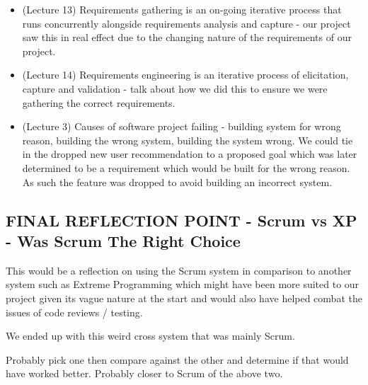 \documentclass{l3proj}
\begin{document}
\begin{itemize}
\item (Lecture 13) Requirements gathering is an on-going iterative process that runs concurrently alongside requirements analysis and capture - our project saw this in real effect due to the changing nature of the requirements of our project.
\item (Lecture 14) Requirements engineering is an iterative process of elicitation, capture and validation - talk about how we did this to ensure we were gathering the correct requirements.
\item (Lecture 3) Causes of software project failing - building system for wrong reason, building the wrong system, building the system wrong. We could tie in the dropped new user recommendation to a proposed goal which was later determined to be a requirement which would be built for the wrong reason. As such the feature was dropped to avoid building an incorrect system.
\end{itemize}



\subsection{FINAL REFLECTION POINT - Scrum vs XP - Was Scrum The Right Choice}
\label{sec:scrumvsxp}
This would be a reflection on using the Scrum system in comparison to another system such as Extreme Programming which might have been more suited to our project given its vague nature at the start and would also have helped combat the issues of code reviews / testing.

We ended up with this weird cross system that was mainly Scrum.

Probably pick one then compare against the other and determine if that would have worked better. Probably closer to Scrum of the above two.
\end{document}
